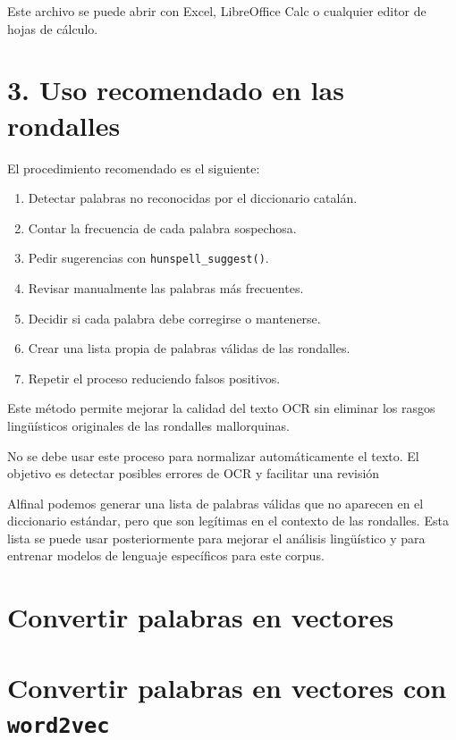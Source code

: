 \documentclass[
  letterpaper,
  DIV=11,
  numbers=noendperiod]{scrreprt}
\providecommand{\tightlist}{%
  \setlength{\itemsep}{0pt}\setlength{\parskip}{0pt}}
\begin{document}
Este archivo se puede abrir con Excel, LibreOffice Calc o cualquier
editor de hojas de cálculo.

\section{3. Uso recomendado en las
rondalles}\label{uso-recomendado-en-las-rondalles}

El procedimiento recomendado es el siguiente:

\begin{enumerate}
\def\labelenumi{\arabic{enumi}.}
\tightlist
\item
  Detectar palabras no reconocidas por el diccionario catalán.
\item
  Contar la frecuencia de cada palabra sospechosa.
\item
  Pedir sugerencias con \texttt{hunspell\_suggest()}.
\item
  Revisar manualmente las palabras más frecuentes.
\item
  Decidir si cada palabra debe corregirse o mantenerse.
\item
  Crear una lista propia de palabras válidas de las rondalles.
\item
  Repetir el proceso reduciendo falsos positivos.
\end{enumerate}

Este método permite mejorar la calidad del texto OCR sin eliminar los
rasgos lingüísticos originales de las rondalles mallorquinas.

No se debe usar este proceso para normalizar automáticamente el texto.
El objetivo es detectar posibles errores de OCR y facilitar una revisión

Alfinal podemos generar una lista de palabras válidas que no aparecen en
el diccionario estándar, pero que son legítimas en el contexto de las
rondalles. Esta lista se puede usar posteriormente para mejorar el
análisis lingüístico y para entrenar modelos de lenguaje específicos
para este corpus.

\section{Convertir palabras en
vectores}\label{convertir-palabras-en-vectores}

\section{\texorpdfstring{Convertir palabras en vectores con
\texttt{word2vec}}{Convertir palabras en vectores con word2vec}}\label{convertir-palabras-en-vectores-con-word2vec}
\end{document}

